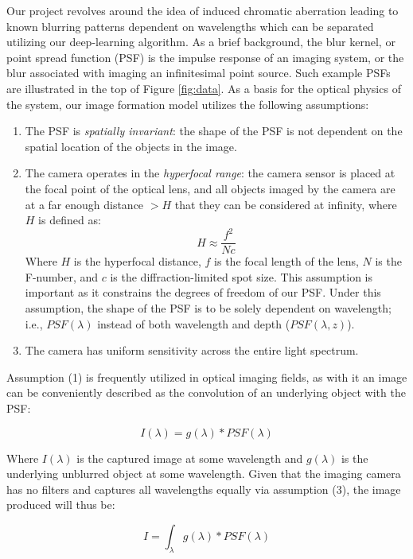 \documentclass{article}
\begin{document}
Our project revolves around the idea of induced chromatic aberration leading to known blurring patterns dependent on wavelengths which can be separated utilizing our deep-learning algorithm. As a brief background, the blur kernel, or point spread function (PSF) is the impulse response of an imaging system, or the blur associated with imaging an infinitesimal point source. Such example PSFs are illustrated in the top of Figure \ref{fig:data}. As a basis for the optical physics of the system, our image formation model utilizes the following assumptions:
\begin{enumerate}
    \item The PSF is \textit{spatially invariant}: the shape of the PSF is not dependent on the spatial location of the objects in the image.
    \item The camera operates in the \textit{hyperfocal range}: the camera sensor is placed at the focal point of the optical lens, and all objects imaged by the camera are at a far enough distance $>H$ that they can be considered at infinity, where $H$ is defined as:
    \begin{equation}
        H \approx \frac{f^2}{Nc}
    \end{equation}
    Where $H$ is the hyperfocal distance, $f$ is the focal length of the lens, $N$ is the F-number, and $c$ is the diffraction-limited spot size. This assumption is important as it constrains the degrees of freedom of our PSF. Under this assumption, the shape of the PSF is to be solely dependent on wavelength; i.e., $PSF(\lambda)$ instead of both wavelength and depth ($PSF(\lambda,z)$).
    \item The camera has uniform sensitivity across the entire light spectrum.
\end{enumerate}

Assumption (1) is frequently utilized in optical imaging fields, as with it an image can be conveniently described as the convolution of an underlying object with the PSF:

\begin{equation}
    I(\lambda) = g(\lambda) \ast PSF(\lambda)
\end{equation}

Where $I(\lambda)$ is the captured image at some wavelength and $g(\lambda)$ is the underlying unblurred object at some wavelength. Given that the imaging camera has no filters and captures all wavelengths equally via assumption (3), the image produced will thus be:

\begin{equation}
    I = \int_\lambda g(\lambda) \ast PSF(\lambda)
\end{equation}
\end{document}
